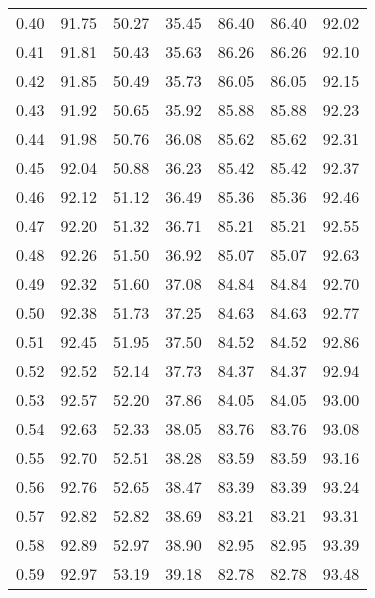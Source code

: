 \begin{tabular}{|c|c|c|c|c|c|c|}
      0.40 &     91.75 &     50.27 &      35.45 &   86.40 &      86.40 &         92.02 \\
      0.41 &     91.81 &     50.43 &      35.63 &   86.26 &      86.26 &         92.10 \\
      0.42 &     91.85 &     50.49 &      35.73 &   86.05 &      86.05 &         92.15 \\
      0.43 &     91.92 &     50.65 &      35.92 &   85.88 &      85.88 &         92.23 \\
      0.44 &     91.98 &     50.76 &      36.08 &   85.62 &      85.62 &         92.31 \\
      0.45 &     92.04 &     50.88 &      36.23 &   85.42 &      85.42 &         92.37 \\
      0.46 &     92.12 &     51.12 &      36.49 &   85.36 &      85.36 &         92.46 \\
      0.47 &     92.20 &     51.32 &      36.71 &   85.21 &      85.21 &         92.55 \\
      0.48 &     92.26 &     51.50 &      36.92 &   85.07 &      85.07 &         92.63 \\
      0.49 &     92.32 &     51.60 &      37.08 &   84.84 &      84.84 &         92.70 \\
      0.50 &     92.38 &     51.73 &      37.25 &   84.63 &      84.63 &         92.77 \\
      0.51 &     92.45 &     51.95 &      37.50 &   84.52 &      84.52 &         92.86 \\
      0.52 &     92.52 &     52.14 &      37.73 &   84.37 &      84.37 &         92.94 \\
      0.53 &     92.57 &     52.20 &      37.86 &   84.05 &      84.05 &         93.00 \\
      0.54 &     92.63 &     52.33 &      38.05 &   83.76 &      83.76 &         93.08 \\
      0.55 &     92.70 &     52.51 &      38.28 &   83.59 &      83.59 &         93.16 \\
      0.56 &     92.76 &     52.65 &      38.47 &   83.39 &      83.39 &         93.24 \\
      0.57 &     92.82 &     52.82 &      38.69 &   83.21 &      83.21 &         93.31 \\
      0.58 &     92.89 &     52.97 &      38.90 &   82.95 &      82.95 &         93.39 \\
      0.59 &     92.97 &     53.19 &      39.18 &   82.78 &      82.78 &         93.48 \\

\end{tabular}
